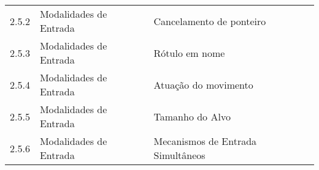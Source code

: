 \begin{table}[]
\begin{tabular}{lll}
 2.5.2           & Modalidades de Entrada & Cancelamento de ponteiro                                                             \\
 
 2.5.3           & Modalidades de Entrada & Rótulo em nome                                                                       \\
 
 2.5.4           & Modalidades de Entrada & Atuação do movimento                                                                 \\
 
 2.5.5           & Modalidades de Entrada & Tamanho do Alvo                                                                     \\

 2.5.6           & Modalidades de Entrada & Mecanismos de Entrada Simultâneos                                                   \\
 \hline
 \end{tabular}
\end{table}



